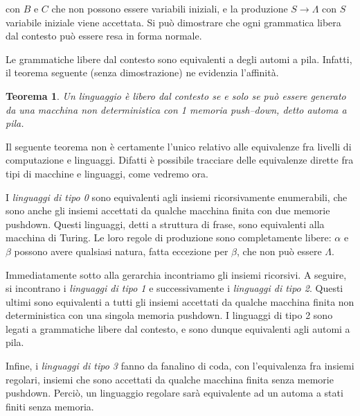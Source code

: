 \documentclass[10pt]{\classname}
\newtheorem{thm}{Teorema}
\theoremstyle{definition}
\theoremstyle{definition}
\begin{document}
con $B$ e $C$ che non possono essere variabili iniziali, e la produzione $S
\rightarrow \Lambda$ con $S$ variabile iniziale viene accettata. Si può
dimostrare che ogni grammatica libera dal contesto può essere resa in forma
normale.

Le grammatiche libere dal contesto sono equivalenti a degli automi a pila.
Infatti, il teorema seguente (senza dimostrazione) ne evidenzia l'affinità.

\begin{thm}
    Un linguaggio è \emph{libero dal contesto} se e solo se può essere generato
    da una macchina non deterministica con 1 memoria push--down, detto automa a
    pila.
\end{thm}

Il seguente teorema non è certamente l'unico relativo alle equivalenze fra
livelli di computazione e linguaggi. Difatti è possibile tracciare delle
equivalenze dirette fra tipi di macchine e linguaggi, come vedremo ora.

I \emph{linguaggi di tipo 0} sono equivalenti agli insiemi ricorsivamente
enumerabili, che sono anche gli insiemi accettati da qualche macchina finita
con due memorie pushdown. Questi linguaggi, detti a struttura di frase, sono
equivalenti alla macchina di Turing. Le loro regole di produzione sono
completamente libere: $\alpha$ e $\beta$ possono avere qualsiasi natura, fatta
eccezione per $\beta$, che non può essere $\Lambda$.

Immediatamente sotto alla gerarchia incontriamo gli insiemi ricorsivi. A
seguire, si incontrano i \emph{linguaggi di tipo 1} e successivamente i
\emph{linguaggi di tipo 2}. Questi ultimi sono equivalenti a tutti gli insiemi
accettati da qualche macchina finita non deterministica con una singola memoria
pushdown. I linguaggi di tipo 2 sono legati a grammatiche libere dal contesto,
e sono dunque equivalenti agli automi a pila.

Infine, i \emph{linguaggi di tipo 3} fanno da fanalino di coda, con
l'equivalenza fra insiemi regolari, insiemi che sono accettati da qualche
macchina finita senza memorie pushdown. Perciò, un linguaggio regolare sarà
equivalente ad un automa a stati finiti senza memoria.
\end{document}
